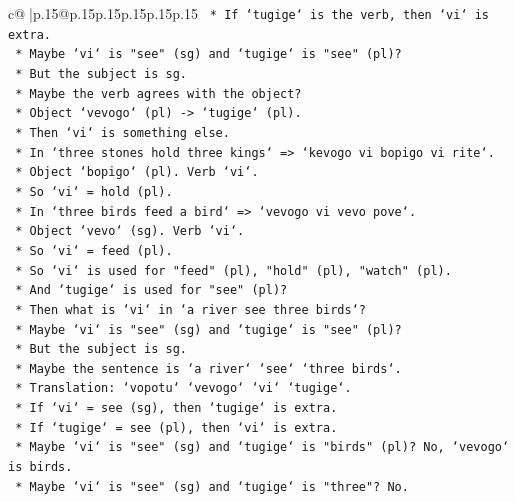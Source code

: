 \documentclass{article}
\begin{document}
{\begin{supertabular}{c@{$\;$}|p{.15\linewidth}@{}p{.15\linewidth}p{.15\linewidth}p{.15\linewidth}p{.15\linewidth}p{.15\linewidth}}
{{{\texttt{                *   If `tugige` is the verb, then `vi` is extra.} \\
\texttt{                *   Maybe `vi` is "see" (sg) and `tugige` is "see" (pl)?} \\
\texttt{                *   But the subject is sg.} \\
\texttt{                *   Maybe the verb agrees with the object?} \\
\texttt{                *   Object `vevogo` (pl) {-}> `tugige` (pl).} \\
\texttt{                *   Then `vi` is something else.} \\
\texttt{                *   In `three stones hold three kings` => `kevogo vi bopigo vi rite`.} \\
\texttt{                *   Object `bopigo` (pl). Verb `vi`.} \\
\texttt{                *   So `vi` = hold (pl).} \\
\texttt{                *   In `three birds feed a bird` => `vevogo vi vevo pove`.} \\
\texttt{                *   Object `vevo` (sg). Verb `vi`.} \\
\texttt{                *   So `vi` = feed (pl).} \\
\texttt{                *   So `vi` is used for "feed" (pl), "hold" (pl), "watch" (pl).} \\
\texttt{                *   And `tugige` is used for "see" (pl)?} \\
\texttt{                *   Then what is `vi` in `a river see three birds`?} \\
\texttt{                *   Maybe `vi` is "see" (sg) and `tugige` is "see" (pl)?} \\
\texttt{                *   But the subject is sg.} \\
\texttt{                *   Maybe the sentence is `a river` `see` `three birds`.} \\
\texttt{                *   Translation: `vopotu` `vevogo` `vi` `tugige`.} \\
\texttt{                *   If `vi` = see (sg), then `tugige` is extra.} \\
\texttt{                *   If `tugige` = see (pl), then `vi` is extra.} \\
\texttt{                *   Maybe `vi` is "see" (sg) and `tugige` is "birds" (pl)? No, `vevogo` is birds.} \\
\texttt{                *   Maybe `vi` is "see" (sg) and `tugige` is "three"? No.} \\
}}}
\end{supertabular}}
\end{document}
